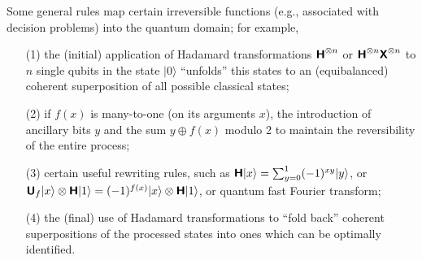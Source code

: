 Some general rules map certain irreversible functions
(e.g., associated with decision problems) into the quantum domain; for example,
\begin{itemize}
\item[(1)]
the (initial) application of Hadamard transformations
$\textsf{\textbf{H}}^{\otimes n}$
or
$\textsf{\textbf{H}}^{\otimes n}\textsf{\textbf{X}}^{\otimes n}$
to $n$ single qubits in the state $\vert 0\rangle$
``unfolds'' this states to  an (equibalanced) coherent
superposition of all possible classical states;

\item[(2)]
if $f(x)$ is many-to-one (on its arguments $x$),
the introduction of ancillary bits $y$ and the sum  $y\oplus f(x)$ modulo 2
to maintain the reversibility of the entire process;

\item[(3)]
certain useful rewriting rules, such as
$
\textsf{\textbf{H}} \vert x \rangle =\sum_{y=0}^1(-1)^{xy} \vert y \rangle
$,  or
$\textsf{\textbf{U}}_f \vert x\rangle \otimes \textsf{\textbf{H}}
\vert 1\rangle
=
(-1)^{f(x)}
\vert x\rangle \otimes \textsf{\textbf{H}}
\vert 1\rangle $,
or quantum fast Fourier transform;

\item[(4)]
the (final) use of Hadamard transformations to ``fold back'' coherent
superpositions of the processed states into ones which can be optimally identified.

\end{itemize}

\newpage


